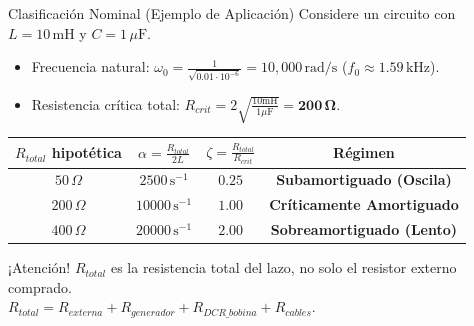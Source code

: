 \documentclass[aspectratio=169, 10pt]{beamer}
\begin{document}
\begin{frame}{Clasificación Nominal (Ejemplo de Aplicación)}
    Considere un circuito con $L = 10\,\text{mH}$ y $C = 1\,\mu\text{F}$. 
    \begin{itemize}
        \item Frecuencia natural: $\omega_0 = \frac{1}{\sqrt{0.01 \cdot 10^{-6}}} = 10,000\,\text{rad/s}$ ($f_0 \approx 1.59\,\text{kHz}$).
        \item Resistencia crítica total: $R_{crit} = 2\sqrt{\frac{10\text{mH}}{1\mu\text{F}}} = \mathbf{200\,\Omega}$.
    \end{itemize}

    \vspace{0.2cm}
    \renewcommand{\arraystretch}{1.3}
    \begin{tabular}{cccc}
    \toprule
    \textbf{$R_{total}$ hipotética} & $\alpha = \frac{R_{total}}{2L}$ & $\zeta = \frac{R_{total}}{R_{crit}}$ & \textbf{Régimen} \\
    \midrule
    $50\,\Omega$ & $2500\,\text{s}^{-1}$ & $0.25$ & \textbf{Subamortiguado (Oscila)} \\
    $200\,\Omega$ & $10000\,\text{s}^{-1}$ & $1.00$ & \textbf{Críticamente Amortiguado} \\
    $400\,\Omega$ & $20000\,\text{s}^{-1}$ & $2.00$ & \textbf{Sobreamortiguado (Lento)} \\
    \bottomrule
    \end{tabular}
    
    \vspace{0.3cm}
    \begin{tcolorbox}[colback=gray!10, colframe=black, title=Física del Mundo Real]
    ¡Atención! $R_{total}$ es la resistencia total del lazo, no solo el resistor externo comprado. \\
    $R_{total} = R_{externa} + R_{generador} + R_{DCR\_bobina} + R_{cables}$.
    \end{tcolorbox}
\end{frame}
\end{document}
